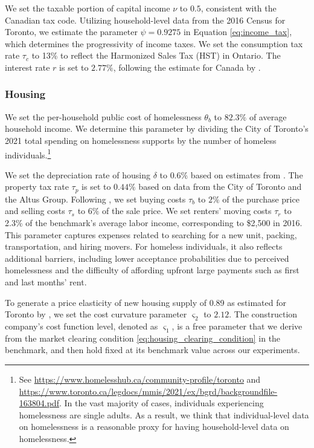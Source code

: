 \documentclass[parskip=full]{article}
\begin{document}
We set the taxable portion of capital income $\nu$ to $0.5$, consistent with the Canadian tax code. Utilizing household-level data from the 2016 Census for Toronto, we estimate the parameter $\psi=0.9275$ in Equation \eqref{eq:income_tax}, which determines the progressivity of income taxes. We set the consumption tax rate $\tau_{c}$ to 13\% to reflect the Harmonized Sales Tax (HST) in Ontario. The interest rate $r$ is set to $2.77\%$, following the estimate for Canada by \citet{bruneau-etal-2018}.

\subsubsection{Housing}

We set the per-household public cost of homelessness $\theta_{b}$ to $82.3\%$ of average household income. We determine this parameter by dividing the City of Toronto's 2021 total spending on homelessness supports by the number of homeless individuals.\footnote{See \url{https://www.homelesshub.ca/community-profile/toronto} and \url{https://www.toronto.ca/legdocs/mmis/2021/ex/bgrd/backgroundfile-163804.pdf}. In the vast majority of cases, individuals experiencing homelessness are single adults. As a result, we think that individual-level data on homelessness is a reasonable proxy for having household-level data on homelessness.}

We set the depreciation rate of housing $\delta$ to $0.6\%$ based on estimates from \citet{rosenthal-2014}. The property tax rate $\tau_p$ is set to $0.44\%$ based on data from the City of Toronto and the Altus Group. Following \citet{gm-2003}, we set buying costs $\tau_{b}$ to $2\%$ of the purchase price and selling costs $\tau_{s}$ to $6\%$ of the sale price. We set renters’ moving costs $\tau_r$ to 2.3\% of the benchmark's average labor income, corresponding to \$2,500 in 2016. This parameter captures expenses related to searching for a new unit, packing, transportation, and hiring movers. For homeless individuals, it also reflects additional barriers, including lower acceptance probabilities due to perceived homelessness and the difficulty of affording upfront large payments such as first and last months' rent.

To generate a price elasticity of new housing supply of 0.89 as estimated for Toronto by \citet{piaxao-2021}, we set the cost curvature parameter $\varsigma_{2}$ to $2.12$. The construction company's cost function level, denoted as $\varsigma_1$, is a free parameter that we derive from the market clearing condition \eqref{eq:housing_clearing_condition} in the benchmark, and then hold fixed at its benchmark value across our experiments.
\end{document}
